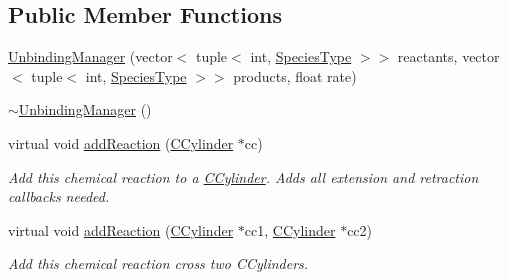 \subsection*{Public Member Functions}
\begin{DoxyCompactItemize}
\item 
\hyperlink{classUnbindingManager_a701803bce8134c0dff76f3e5af78c687}{Unbinding\+Manager} (vector$<$ tuple$<$ int, \hyperlink{Species_8h_a50651af47c56ea0e27235468d23542cf}{Species\+Type} $>$$>$ reactants, vector$<$ tuple$<$ int, \hyperlink{Species_8h_a50651af47c56ea0e27235468d23542cf}{Species\+Type} $>$$>$ products, float rate)
\item 
\hyperlink{classUnbindingManager_af1a852cd326b5f62e18e9389e2ee8b8c}{$\sim$\+Unbinding\+Manager} ()
\item 
virtual void \hyperlink{classUnbindingManager_a75a0b4e709bfb0787c8cec09b7255229}{add\+Reaction} (\hyperlink{classCCylinder}{C\+Cylinder} $\ast$cc)
\begin{DoxyCompactList}\small\item\em Add this chemical reaction to a \hyperlink{classCCylinder}{C\+Cylinder}. Adds all extension and retraction callbacks needed. \end{DoxyCompactList}\item 
virtual void \hyperlink{classUnbindingManager_a94018a46f879c98bd8b82f832a07b92d}{add\+Reaction} (\hyperlink{classCCylinder}{C\+Cylinder} $\ast$cc1, \hyperlink{classCCylinder}{C\+Cylinder} $\ast$cc2)
\begin{DoxyCompactList}\small\item\em Add this chemical reaction cross two C\+Cylinders. \end{DoxyCompactList}\end{DoxyCompactItemize}
